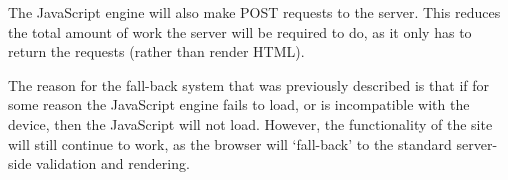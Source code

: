 The JavaScript engine will also make POST requests to the server. This reduces 
the total amount of work the server will be required to do, as it only has to 
return the requests (rather than render HTML).

The reason for the fall-back system that was previously described is that if for some reason 
the JavaScript engine fails to load, or is incompatible with the device, then 
the JavaScript will not load. However, the functionality of the site will still 
continue to work, as the browser will `fall-back' to the standard server-side 
validation and rendering.
